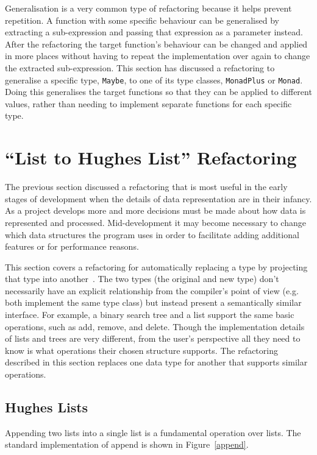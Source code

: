 Generalisation is a very common type of refactoring because it helps prevent repetition. A function with some specific behaviour can be generalised by extracting a sub-expression and passing that expression as a parameter instead. After the refactoring the target function's behaviour can be changed and applied in more places without having to repeat the implementation over again to change the extracted sub-expression. This section has discussed a refactoring to generalise a specific type, \texttt{Maybe}, to one of its type classes, \texttt{MonadPlus} or \texttt{Monad}. Doing this generalises the target functions so that they can be applied to different values, rather than needing to implement separate functions for each specific type.
 
\section{``List to Hughes List'' Refactoring}\label{listToDlist}

The previous section discussed a refactoring that is most useful in the early stages of development when the details of data representation are in their infancy. As a project develops more and more decisions must be made about how data is represented and processed. Mid-development it may become necessary to change which data structures the program uses in order to facilitate adding additional features or for performance reasons.

This section covers a refactoring for automatically replacing a type by projecting that type into another~\citep{galoisConnection}. The two types (the original and new type) don't necessarily have an explicit relationship from the compiler's point of view (e.g. both implement the same type class) but instead present a semantically similar interface. For example, a binary search tree and a list support the same basic operations, such as add, remove, and delete. Though the implementation details of lists and trees are very different, from the user's perspective all they need to know is what operations their chosen structure supports. The refactoring described in this section replaces one data type for another that supports similar operations.

\subsection{Hughes Lists}

Appending two lists into a single list is a fundamental operation over lists. The standard implementation of append is shown in Figure~\ref{append}.

